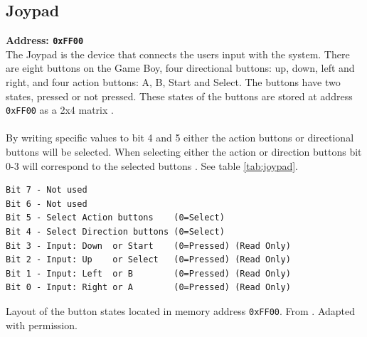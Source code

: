 
\subsection{Joypad}
\label{sec:Joypad}
\textbf{Address: \texttt{0xFF00}}
\\
The Joypad is the device that connects the users input with the system. 
There are eight buttons on the Game Boy, four directional buttons: up, down, left and right, and four action buttons: A, B, Start and Select.
The buttons have two states, pressed or not pressed. 
These states of the buttons are stored at address \texttt{0xFF00} as a 2x4 matrix \cite{pandocsjoypad}.
\\\\
By writing specific values to bit 4 and 5 either the action buttons or directional buttons will be selected.
When selecting either the action or direction buttons bit 0-3 will correspond to the selected buttons \cite{pandocsjoypad}. See table \ref{tab:joypad}.


\begin{table}[H]
    \begin{center}

\begin{BVerbatim}
Bit 7 - Not used
Bit 6 - Not used
Bit 5 - Select Action buttons    (0=Select)
Bit 4 - Select Direction buttons (0=Select)
Bit 3 - Input: Down  or Start    (0=Pressed) (Read Only)
Bit 2 - Input: Up    or Select   (0=Pressed) (Read Only)
Bit 1 - Input: Left  or B        (0=Pressed) (Read Only)
Bit 0 - Input: Right or A        (0=Pressed) (Read Only)
\end{BVerbatim}

    \caption{Layout of the button states located in memory address \texttt{0xFF00}. From \cite{pandocsjoypad}. Adapted with permission.}
    \label{tab:joypad}
    \end{center}
\end{table}

